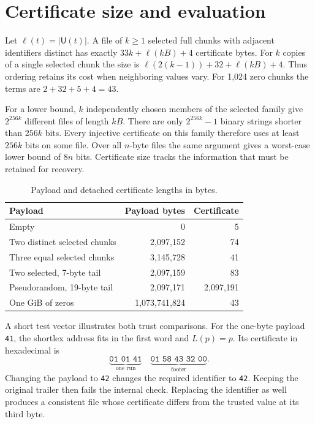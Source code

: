 \documentclass[10pt,twocolumn,letterpaper]{article}
\newcommand{\byte}[1]{\texttt{#1}}
\newcommand{\len}[1]{\lvert #1\rvert}
\newcommand{\U}{\mathsf{U}}
\begin{document}
\section{Certificate size and evaluation}
Let \(\ell(t)=\len{\U(t)}\). A file of \(k\ge1\) selected full chunks with adjacent identifiers distinct has exactly \(33k+\ell(kB)+4\) certificate bytes. For \(k\) copies of a single selected chunk the size is \(\ell(2(k-1))+32+\ell(kB)+4\). Thus ordering retains its cost when neighboring values vary. For 1,024 zero chunks the terms are \(2+32+5+4=43\).

For a lower bound, \(k\) independently chosen members of the selected family give \(2^{256k}\) different files of length \(kB\). There are only \(2^{256k}-1\) binary strings shorter than \(256k\) bits. Every injective certificate on this family therefore uses at least \(256k\) bits on some file. Over all \(n\)-byte files the same argument gives a worst-case lower bound of \(8n\) bits. Certificate size tracks the information that must be retained for recovery.

\begin{table}[ht]
\centering\small
\caption{Payload and detached certificate lengths in bytes.}
\label{tab:measure}
\begin{tabular}{@{}lrr@{}}
\toprule
Payload & Payload bytes & Certificate\\
\midrule
Empty & 0 & 5\\
Two distinct selected chunks & 2,097,152 & 74\\
Three equal selected chunks & 3,145,728 & 41\\
Two selected, 7-byte tail & 2,097,159 & 83\\
Pseudorandom, 19-byte tail & 2,097,171 & 2,097,191\\
One GiB of zeros & 1,073,741,824 & 43\\
\bottomrule
\end{tabular}
\end{table}

\balance
A short test vector illustrates both trust comparisons. For the one-byte payload \byte{41}, the shortlex address fits in the first word and \(L(p)=p\). Its certificate in hexadecimal is
\[
 \underbrace{\byte{01 01 41}}_{\text{one run}}
 \quad\underbrace{\byte{01 58 43 32 00}}_{\text{footer}} .
\]
Changing the payload to \byte{42} changes the required identifier to \byte{42}. Keeping the original trailer then fails the internal check. Replacing the identifier as well produces a consistent file whose certificate differs from the trusted value at its third byte.
\end{document}
